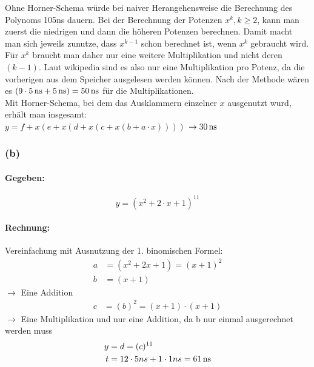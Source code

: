 \documentclass[11pt,a4paper]{article}
\begin{document}
Ohne Horner-Schema würde bei naiver Herangehensweise die Berechnung des Polynoms 105ns dauern.
Bei der Berechnung der Potenzen $x^k, k\geq2$, kann man zuerst die niedrigen und dann die höheren Potenzen berechnen. Damit macht man sich jeweils zunutze, dass $x^{k-1}$ schon berechnet ist, wenn $x^{k}$ gebraucht wird. Für $x^{k}$ braucht man daher nur eine weitere Multiplikation und nicht deren $(k-1)$.
Laut wikipedia sind es also nur eine Multiplikation pro Potenz, da die vorherigen aus dem Speicher ausgelesen werden können\cite{wiki:1}.
Nach der Methode wären es $(9\cdot\unit[5]{ns} + \unit[5]{ns}) = \unit[50]{ns}$ für die Multiplikationen.\\

Mit Horner-Schema, bei dem das Ausklammern einzelner $x$ ausgenutzt wurd, erhält man insgesamt:\\
$y = f + x (e + x ( d + x ( c + x ( b + a \cdot x ))))$
$\rightarrow \unit[30]{ns}$

\newpage

\subsubsection{(b)} %

\paragraph{Gegeben:}
\begin{equation}
y = (x^{2}+2\cdot x+1)^{11}
\end{equation}

\paragraph{Rechnung:}

Vereinfachung mit Ausnutzung der 1. binomischen Formel:
\begin{align}
a &= (x^2+2x+1)=(x+1)^2\\
b &= (x+1)
\end{align}
$\rightarrow$ Eine Addition
\begin{align}
c &= (b)^2=(x+1)\cdot(x+1)
\end{align}
$\rightarrow$ Eine Multiplikation und nur eine Addition, da b nur einmal ausgerechnet werden muss\\
\begin{align}
y &= d=(c)^{11}\\
t &= 12\cdot 5ns + 1 \cdot 1ns = \unit[61]{ns}
\end{align}
\end{document}
